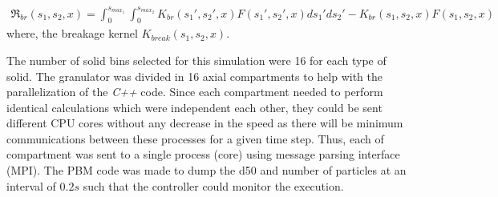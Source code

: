 \documentclass[fleqn,twoside,10pt]{article}
\begin{document}
\begin{align}
\Re_{br}(s_1,s_2,x) = \int_0^{s_{max_1}} \int_0^{s_{max_2}} 
K_{br}(s_1',s_2',x)F(s_1',s_2',x)ds_1'ds_2' - K_{br}(s_1,s_2,x)F(s_1,s_2,x)
\label{eqn:PBM_break_cons}
\end{align}
where, the breakage kernel $K_{break}(s_1,s_2,x)$. 

The number of solid bins selected for this simulation were 16 for each type of 
solid. The granulator was 
divided in 16 axial compartments to help with the parallelization of the \textit{C++} code. Since each 
compartment needed to perform identical calculations which were independent each other, they could 
be sent different CPU cores without any decrease in the speed as there will be minimum communications 
between these processes for a given time step. Thus, each of compartment was sent to a single process 
(core) using message parsing interface (MPI). The PBM code was made to dump the d50 and number of 
particles at an interval of $0.2s$ such that the controller could monitor the 
execution. 

%
%


\end{document}
